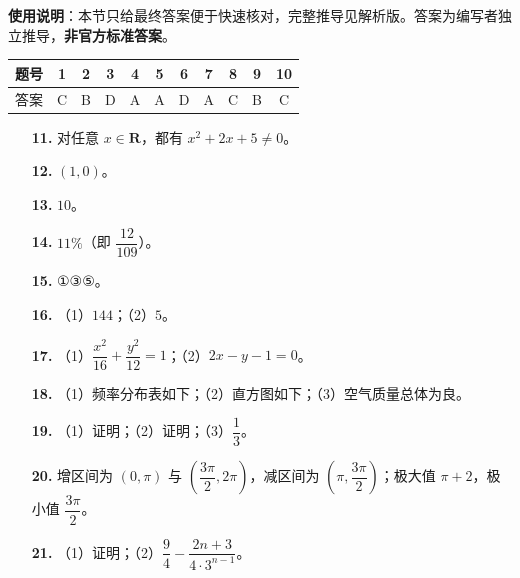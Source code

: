 
\begin{gknotice}
\textbf{使用说明}：本节只给最终答案便于快速核对，完整推导见解析版。答案为编写者独立推导，\textbf{非官方标准答案}。
\end{gknotice}

\begin{center}\begin{tabular}{ccccccccccc}
\toprule
题号 & 1 & 2 & 3 & 4 & 5 & 6 & 7 & 8 & 9 & 10 \\
\midrule
答案 & C & B & D & A & A & D & A & C & B & C \\
\bottomrule
\end{tabular}\end{center}

\begin{itemize}[leftmargin=2.6em]
  \item[\textbf{11.}] 对任意 $x\in\mathbf R$，都有 $x^2+2x+5\neq0$。
  \item[\textbf{12.}] $(1,0)$。
  \item[\textbf{13.}] $10$。
  \item[\textbf{14.}] $11\%$（即 $\dfrac{12}{109}$）。
  \item[\textbf{15.}] ①③⑤。
\end{itemize}

\begin{itemize}[leftmargin=2.6em]
  \item[\textbf{16.}] （1）$144$；（2）$5$。
  \item[\textbf{17.}] （1）$\dfrac{x^2}{16}+\dfrac{y^2}{12}=1$；（2）$2x-y-1=0$。
  \item[\textbf{18.}] （1）频率分布表如下；（2）直方图如下；（3）空气质量总体为良。
  \item[\textbf{19.}] （1）证明；（2）证明；（3）$\dfrac13$。
  \item[\textbf{20.}] 增区间为 $(0,\pi)$ 与 $\left(\dfrac{3\pi}2,2\pi\right)$，减区间为 $\left(\pi,\dfrac{3\pi}2\right)$；极大值 $\pi+2$，极小值 $\dfrac{3\pi}2$。
  \item[\textbf{21.}] （1）证明；（2）$\dfrac94-\dfrac{2n+3}{4\cdot3^{n-1}}$。
\end{itemize}
